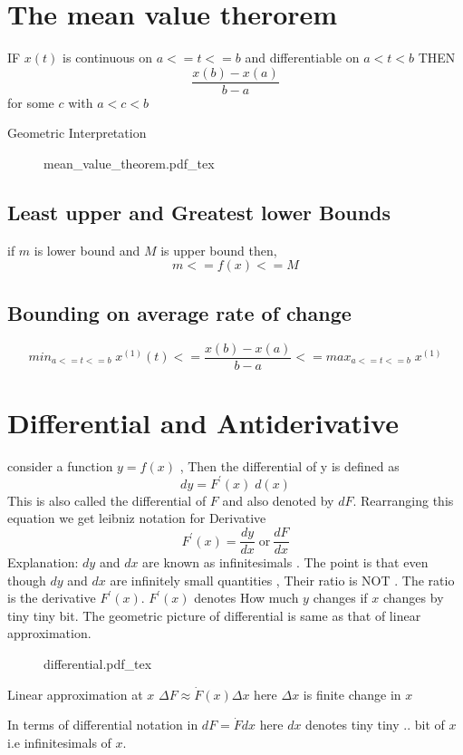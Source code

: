 \section{The mean value therorem}
IF $x(t)$ is continuous on $a<=t<=b$ and differentiable on $a<t<b$ THEN
\[
	\frac{x(b)-x(a)}{b-a}
\]
for some $c$ with $a<c<b$ 

Geometric Interpretation 
\begin{figure}[H]
\centering
\def\svgwidth{\columnwidth}
{mean_value_theorem.pdf_tex}
\end{figure}

\subsection{Least upper and Greatest lower Bounds} 
if $m$ is lower bound and $M$ is upper bound then,
\[
	m<=f(x)<=M
\]

\subsection{Bounding on average rate of change}
\[
	min_{a<=t<=b} \; x^{(1)}(t) <= \frac{x(b)-x(a)}{b-a} <= max_{a<=t<=b}\; x^{(1)}
\]

\section{Differential and Antiderivative}
consider a function $y=f(x)$ , Then the differential of y is 
defined as 
\[
	dy = F^{'}(x) \; d(x)
\]
This is also called the differential of $F$ and also denoted by $dF$. 
Rearranging this equation we get leibniz notation for Derivative
\[
	F^{'}(x) = \frac{dy}{dx} \; \text{or} \: \frac{dF}{dx}
\]
Explanation: 
$dy$ and $dx$ are known as infinitesimals . The point is that 
even though $dy$ and $dx$ are infinitely small quantities , Their ratio 
is NOT . The ratio is the derivative $F^{'}(x)$. $F^{'}(x)$ denotes 
How much $y$ changes if $x$ changes by tiny tiny bit. The geometric 
picture of differential is same as that of linear approximation. 

\begin{figure}[H]
  \centering
  \def\svgwidth{0.5\columnwidth}
  {differential.pdf_tex}
\end{figure}

Linear approximation at $x$ $\Delta F \approx \dot F(x) \Delta x $
here $\Delta x$ is finite change in $x$ 

In terms of differential notation in $dF = \dot{F} dx$ 
here $dx$ denotes tiny tiny .. bit of $x$ i.e infinitesimals of $x$. 

